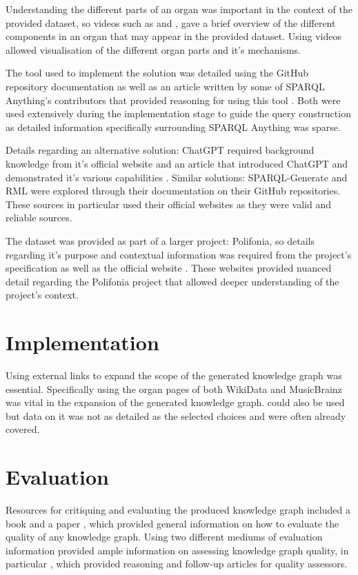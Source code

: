 Understanding the different parts of an organ was important in the context of the provided dataset, so videos such as \cite{organvideo} and \cite{organvideo1}, gave a brief overview of the different components in an organ that may appear in the provided dataset. Using videos allowed visualisation of the different organ parts and it's mechanisms.   

The tool used to implement the solution was detailed using the GitHub repository documentation \cite{sparqlanythinggithub} as well as an article written by some of SPARQL Anything's contributors that provided reasoning for using this tool \cite{sparqlanything}. Both were used extensively during the implementation stage to guide the query construction as detailed information specifically surrounding SPARQL Anything was sparse. 

Details regarding an alternative solution: ChatGPT required background knowledge from it's official website \cite{chatgptwebsite} and an article that introduced ChatGPT and demonstrated it's various capabilities \cite{chatgpt}. Similar solutions: SPARQL-Generate \cite{sparqlgenerate} and RML \cite{rml} were explored through their documentation on their GitHub repositories. These sources in particular used their official websites as they were valid and reliable sources. 

The dataset was provided as part of a larger project: Polifonia, so details regarding it's purpose and contextual information was required from the project's specification \cite{polifoniaproject} as well as the official website \cite{polifonia}. These websites provided nuanced detail regarding the Polifonia project that allowed deeper understanding of the project's context. 

\section{Implementation}
\hspace{0.5cm} Using external links to expand the scope of the generated knowledge graph was essential. Specifically using the organ pages of both WikiData \cite{organwikidata} and MusicBrainz \cite{organmusicbrainz} was vital in the expansion of the generated knowledge graph. \cite{organdbpedia} could also be used but data on it was not as detailed as the selected choices and were often already covered.

\section{Evaluation}
\hspace{0.5cm} Resources for critiquing and evaluating the produced knowledge graph included a book \cite{knowledgegraphevaulationbook} and a paper \cite{evaluationpaper}, which provided general information on how to evaluate the quality of any knowledge graph. Using two different mediums of evaluation information provided ample information on assessing knowledge graph quality, in particular \cite{evaluationpaper}, which provided reasoning and follow-up articles for quality assessors. 

